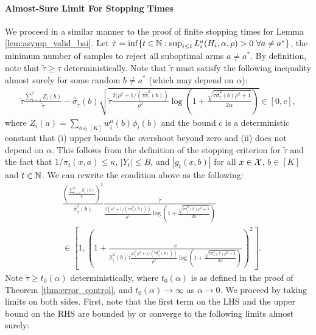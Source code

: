 \documentclass{article}
\begin{document}
\begin{appendices}
\paragraph{Almost-Sure Limit For Stopping Times}
We proceed in a similar manner to the proof of finite stopping times for Lemma \ref{lem:asymp_valid_bai}. Let $\tilde\tau = \inf\{t \in \mathbb{N}: \sup_{i \leq t} L_i^a(H_i, \alpha, \rho) > 0 \ \forall a \neq a^*\}$, the minimum number of samples to reject all suboptimal arms $a \neq a^*$. By definition, note that $\tilde{\tau} \geq \tau$ deterministically. Note that $\tilde\tau$ must satisfy the following inequality almost surely for some random $b \neq a^*$ (which may depend on $\alpha$):
\begin{align}
        \tilde{\tau}\frac{\sum_{i=1}^{\tilde\tau}Z_i(b)}{\tilde{\tau}} -  \hat\sigma_{\tilde{\tau}}(b )\sqrt{ \tilde{\tau}\frac{2(\rho^2 + 1/(\tilde{\tau}\hat\sigma_{\tilde{\tau}}^2(b) )}{\rho^2} \log\left( 1+ \frac{\sqrt{\tilde{\tau} \hat\sigma_{\tilde{\tau}}^2(b )\rho^2 + 1 }}{2\alpha}\right)} \in [0, c],
\end{align}
where $Z_i(a) = \sum_{b \in [K]} w_i^a(b) \phi_i(b)$ and the bound $c$ is a deterministic constant that (i) upper bounds the overshoot beyond zero and (ii) does not depend on $\alpha$. This follows from the definition of the stopping criterion for $\tilde\tau$ and the fact that $1/\pi_t(x,a) \leq \kappa$, $|Y_t| \leq B$, and $|g_t(x,b)|$ for all $x \in \mathcal{X}$, $b \in [K]$ and $t \in \mathbb{N}$. We can rewrite the condition above as the following:
\begin{align}
        &\frac{\left(\frac{\sum_{i=1}^{\tilde{\tau}}{Z}_i(b)}{\tilde\tau}\right)^2}{\hat\sigma^2_{\tilde{\tau}}(b)} \frac{\tilde\tau}{{ \frac{2(\rho^2 + 1/(\tilde{\tau}\hat\sigma^2_{\tilde{\tau}}(b ) ))}{\rho^2} \log\left( 1+ \frac{\sqrt{\tilde\tau \hat\sigma^2_{\tilde{\tau}}(b)\rho^2 + 1 }}{2\alpha}\right)}} \\
        &\in \left[1, \left(1+\frac{c}{\hat\sigma^2_{\tilde{\tau}}(b)\tilde\tau\frac{2(\rho^2 + 1/(\tilde\tau\hat\sigma^2_{\tilde{\tau}}(b )))}{\rho^2} \log\left( 1+ \frac{\sqrt{\tilde\tau \hat\sigma^2_{\tilde{\tau}}( b )\rho^2 + 1 }}{2\alpha}\right)}\right)^2\right] \label{eq:deterministic_bounds}.
\end{align}
Note $\tilde{\tau} \geq t_0(\alpha)$ deterministically, where $t_0(\alpha)$ is as defined in the proof of Theorem \ref{thm:error_control}, and $t_0(\alpha) \rightarrow \infty$ as $\alpha \rightarrow 0$. We proceed by taking limits on both sides. First, note that the first term on the LHS and the upper bound on the RHS are bounded by or converge to the following limits almost surely: 

\end{appendices}
\end{document}

